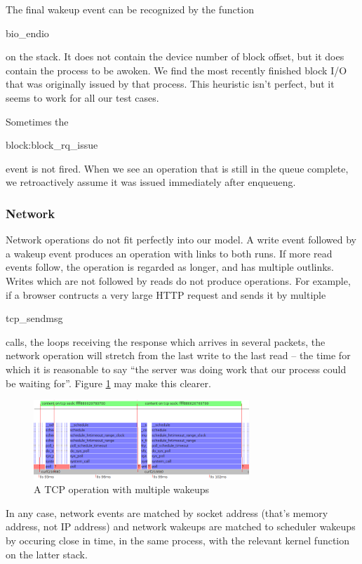 \documentclass[10pt]{article}
\begin{document}
The final wakeup event can be recognized by the function \begin{tt}bio\_endio\end{tt} on the stack.  It does not contain the device number of block offset, but it does contain the process to be awoken.  We find the most recently finished block I/O that was originally issued by that process.  This heuristic isn't perfect, but it seems to work for all our test cases.

Sometimes the \begin{tt}block:block\_rq\_issue\end{tt} event is not fired.  When we see an operation that is still in the queue complete, we retroactively assume it was issued immediately after enqueueng.

\subsubsection{Network}

Network operations do not fit perfectly into our model.  A write event followed by a wakeup event produces an operation with links to both runs.  If more read events follow, the operation is regarded as longer, and has multiple outlinks.  Writes which are not followed by reads do not produce operations.  For example, if a browser contructs a very large HTTP request and sends it by multiple \begin{tt}tcp\_sendmsg\end{tt} calls, the loops receiving the response which arrives in several packets, the network operation will stretch from the last write to the last read -- the time for which it is reasonable to say ``the server was doing work that our process could be waiting for''.  Figure \ref{fig:tcp} may make this clearer. 

\begin{figure}[h!]
\includegraphics[width=3.2in]{images/tcpexample}
\caption{A TCP operation with multiple wakeups}
\label{fig:tcp}
\end{figure}

In any case, network events are matched by socket address (that's memory address, not IP address) and network wakeups are matched to scheduler wakeups by occuring close in time, in the same process, with the relevant kernel function on the latter stack.
\end{document}
